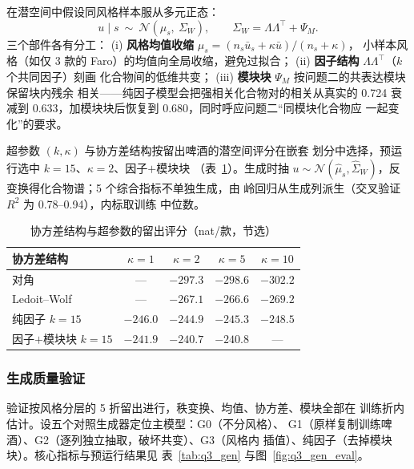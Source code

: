 \documentclass[12pt,a4paper]{article}
\begin{document}
在潜空间中假设同风格样本服从多元正态：
\begin{equation}
  u\mid s\ \sim\ \mathcal N(\mu_s,\ \Sigma_W),\qquad
  \Sigma_W=\Lambda\Lambda^\top+\Psi_M .
\end{equation}
三个部件各有分工：
(i) \textbf{风格均值收缩} $\hat\mu_s=(n_s\bar u_s+\kappa\bar u)/(n_s+\kappa)$，
小样本风格（如仅 3 款的 Faro）的均值向全局收缩，避免过拟合；
(ii) \textbf{因子结构} $\Lambda\Lambda^\top$（$k$ 个共同因子）刻画
化合物间的低维共变；
(iii) \textbf{模块块} $\Psi_M$ 按问题二的共表达模块保留块内残余
相关——纯因子模型会把强相关化合物对的相关从真实的 0.724 衰减到
0.633，加模块块后恢复到 0.680，同时呼应问题二``同模块化合物应
一起变化''的要求。

超参数 $(k,\kappa)$ 与协方差结构按留出啤酒的潜空间评分在嵌套
划分中选择，预运行选中 $k=15$、$\kappa=2$、因子$+$模块块
（表~\ref{tab:q3_score}）。生成时抽 $u\sim\mathcal N(\hat\mu_s,
\hat\Sigma_W)$，反变换得化合物谱；5 个综合指标不单独生成，由
岭回归从生成列派生（交叉验证 $R^2$ 为 0.78--0.94），内标取训练
中位数。

\begin{table}[htbp]
  \centering\small
  \caption{协方差结构与超参数的留出评分（nat/款，节选）}
  \label{tab:q3_score}
  \begin{tabular}{lcccc}
    \toprule
    协方差结构 & $\kappa=1$ & $\kappa=2$ & $\kappa=5$ & $\kappa=10$ \\
    \midrule
    对角 & --- & $-297.3$ & $-298.6$ & $-302.2$ \\
    Ledoit--Wolf & --- & $-267.1$ & $-266.6$ & $-269.2$ \\
    纯因子 $k=15$ & $-246.0$ & $-244.9$ & $-245.3$ & $-248.5$ \\
    因子$+$模块块 $k=15$ & $-241.9$ & $\mathbf{-240.7}$ & $-240.8$ & --- \\
    \bottomrule
  \end{tabular}
\end{table}

\subsubsection{生成质量验证}

验证按风格分层的 5 折留出进行，秩变换、均值、协方差、模块全部在
训练折内估计。设五个对照生成器定位主模型：G0（不分风格）、
G1（原样复制训练啤酒）、G2（逐列独立抽取，破坏共变）、G3（风格内
插值）、纯因子（去掉模块块）。核心指标与预运行结果见
表~\ref{tab:q3_gen} 与图~\ref{fig:q3_gen_eval}。
\end{document}
